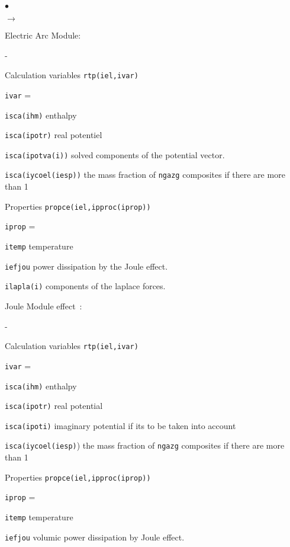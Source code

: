 {{{\begin{list}{$\bullet$}{}
\begin{list}{$\rightarrow$}{}
  \item Electric Arc Module:
  \begin{list}{-}{}
     \item Calculation variables \texttt{rtp(iel,ivar)}
     \begin{list}{\texttt{ivar} = }{}
       \item \texttt{isca(ihm)} enthalpy
       \item \texttt{isca(ipotr)} real potentiel
       \item \texttt{isca(ipotva(i))} solved components of the potential vector.
       \item \texttt{isca(iycoel(iesp))} the mass fraction of \texttt{ngazg}
 composites if there are more than 1
     \end{list}
     \item Properties \texttt{propce(iel,ipproc(iprop))}
     \begin{list}{\texttt{iprop} = }{}
       \item \texttt{itemp}  temperature
       \item \texttt{iefjou} power dissipation by the Joule effect.
       \item \texttt{ilapla(i)} components of the laplace forces.
     \end{list}
   \end{list}
   \item Joule Module effect~:
   \begin{list}{-}{}
     \item Calculation variables \texttt{rtp(iel,ivar)}
     \begin{list}{\texttt{ivar} = }{}
       \item \texttt{isca(ihm)} enthalpy
       \item \texttt{isca(ipotr)} real potential
       \item \texttt{isca(ipoti)} imaginary potential if its to be taken into account
       \item \texttt{isca(iycoel(iesp)}) the mass fraction of \texttt{ngazg}
 composites if there are more than 1
     \end{list}
     \item Properties \texttt{propce(iel,ipproc(iprop))}
     \begin{list}{\texttt{iprop} = }{}
       \item \texttt{itemp} temperature
       \item \texttt{iefjou} volumic power dissipation by Joule effect.
     \end{list}
   \end{list}
\end{list}


\end{list}}}}
